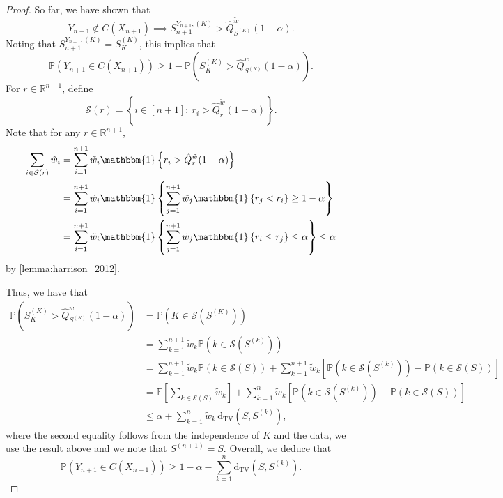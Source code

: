 \documentclass[11pt, titlepage]{article} %
\newcommand{\R}{\mathrm}
\newcommand{\Prob}[1]{\mathbb{P}\left( #1 \right)}
\newcommand{\Exp}[3]{\mathbb{E}\left#2 #1 \right#3}
\newcommand{\Ind}[1]{\mathbbm{1}\left\{ #1 \right\}}
\numberwithin{equation}{section}
\theoremstyle{definition}
\numberwithin{theorem}{section}
\numberwithin{lemma}{section}
\numberwithin{corollary}{section}
\numberwithin{proposition}{section}
\numberwithin{definition}{section}
\numberwithin{remark}{section}
\begin{document}
\begin{proof}
    \noindent
    So far, we have shown that \[Y_{n+1} \not \in C(X_{n+1}) \implies S_{n+1}^{Y_{n+1}, (K)} >\hat{Q}^{\tilde{w}}_{S^{(K)}}(1-\alpha).\] Noting that \(S_{n+1}^{Y_{n+1}, (K)} = S_K^{(K)}\), this implies that \[\Prob{Y_{n+1} \in C(X_{n+1}) } \geq 1 - \Prob{ S_K^{(K)} > \hat{Q}^{\tilde{w}}_{S^{(K)}}(1-\alpha) }. \]
    \noindent
    For \(r \in \mathbb{R}^{n+1}\), define \[\mathcal{S}(r) = \left\{ i \in [n+1]: \ r_i > \hat{Q}^{\tilde{w}}_r(1-\alpha) \right\}.\] Note that for any \(r \in \mathbb{R}^{n+1}\), \begin{align*}
        \sum_{i \in \mathcal{S}(r)} \tilde{w}_i &= \sum_{i=1}^{n+1} \tilde{w}_i \Ind{r_i > \hat{Q}^{\tilde{w}}_r(1-\alpha)} \\
        &= \sum_{i=1}^{n+1} \tilde{w}_i \Ind{\sum_{j=1}^{n+1} \tilde{w_j} \Ind{r_j < r_i} \geq 1-\alpha} \\
        &= \sum_{i=1}^{n+1} \tilde{w}_i \Ind{\sum_{j=1}^{n+1} \tilde{w_j} \Ind{r_i \leq r_j} \leq \alpha} \leq \alpha
    \end{align*} by \cref{lemma:harrison_2012}. \vskip5pt
    
    \noindent
    Thus, we have that \begin{align*}
        \Prob{ S_K^{(K)} > \hat{Q}^{\tilde{w}}_{S^{(K)}}(1-\alpha) } &= \Prob{K \in \mathcal{S}(S^{(K)})} \\
        &= \sum_{k=1}^{n+1} \tilde{w}_k \Prob{k \in \mathcal{S}(S^{(k)})} \\
        &= \sum_{k=1}^{n+1} \tilde{w}_k \Prob{k \in \mathcal{S}(S)} + \sum_{k=1}^{n+1} \tilde{w}_k \left[\Prob{k \in \mathcal{S}(S^{(k)})} - \Prob{k \in \mathcal{S}(S)} \right] \\
        &= \Exp{\sum_{k \in \mathcal{S}(S)} \tilde{w}_k }{[}{]} + \sum_{k=1}^{n} \tilde{w}_k \left[\Prob{k \in \mathcal{S}(S^{(k)})} - \Prob{k \in \mathcal{S}(S)} \right] \\
        &\leq \alpha + \sum_{k=1}^n \tilde{w}_k \, \R{d_{TV}}(S, S^{(k)}),
    \end{align*} where the second equality follows from the independence of \(K\) and the data, we use the result above and we note that \(S^{(n+1)} = S\). Overall, we deduce that \[\Prob{Y_{n+1} \in C(X_{n+1})}  \geq 1-\alpha - \sum_{k=1}^n \R{d_{TV}}(S, S^{(k)}).\]

\end{proof}
\end{document}
